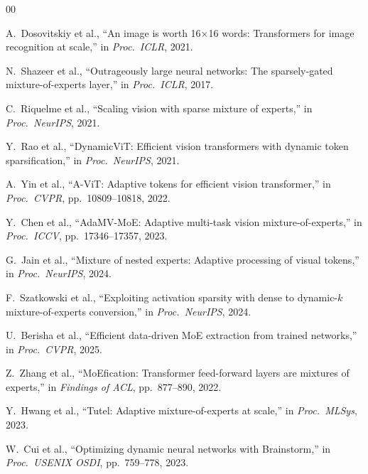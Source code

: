 \documentclass[conference]{IEEEtran}
\begin{document}
\balance
\begin{thebibliography}{00}

A.~Dosovitskiy et al., ``An image is worth 16$\times$16 words: Transformers for image recognition at scale,'' in \textit{Proc.\ ICLR}, 2021.

N.~Shazeer et al., ``Outrageously large neural networks: The sparsely-gated mixture-of-experts layer,'' in \textit{Proc.\ ICLR}, 2017.

C.~Riquelme et al., ``Scaling vision with sparse mixture of experts,'' in \textit{Proc.\ NeurIPS}, 2021.

Y.~Rao et al., ``DynamicViT: Efficient vision transformers with dynamic token sparsification,'' in \textit{Proc.\ NeurIPS}, 2021.

A.~Yin et al., ``A-ViT: Adaptive tokens for efficient vision transformer,'' in \textit{Proc.\ CVPR}, pp.~10809--10818, 2022.

Y.~Chen et al., ``AdaMV-MoE: Adaptive multi-task vision mixture-of-experts,'' in \textit{Proc.\ ICCV}, pp.~17346--17357, 2023.

G.~Jain et al., ``Mixture of nested experts: Adaptive processing of visual tokens,'' in \textit{Proc.\ NeurIPS}, 2024.

F.~Szatkowski et al., ``Exploiting activation sparsity with dense to dynamic-$k$ mixture-of-experts conversion,'' in \textit{Proc.\ NeurIPS}, 2024.

U.~Berisha et al., ``Efficient data-driven MoE extraction from trained networks,'' in \textit{Proc.\ CVPR}, 2025.

Z.~Zhang et al., ``MoEfication: Transformer feed-forward layers are mixtures of experts,'' in \textit{Findings of ACL}, pp.~877--890, 2022.

Y.~Hwang et al., ``Tutel: Adaptive mixture-of-experts at scale,'' in \textit{Proc.\ MLSys}, 2023.

W.~Cui et al., ``Optimizing dynamic neural networks with Brainstorm,'' in \textit{Proc.\ USENIX OSDI}, pp.~759--778, 2023.


\end{thebibliography}
\end{document}
